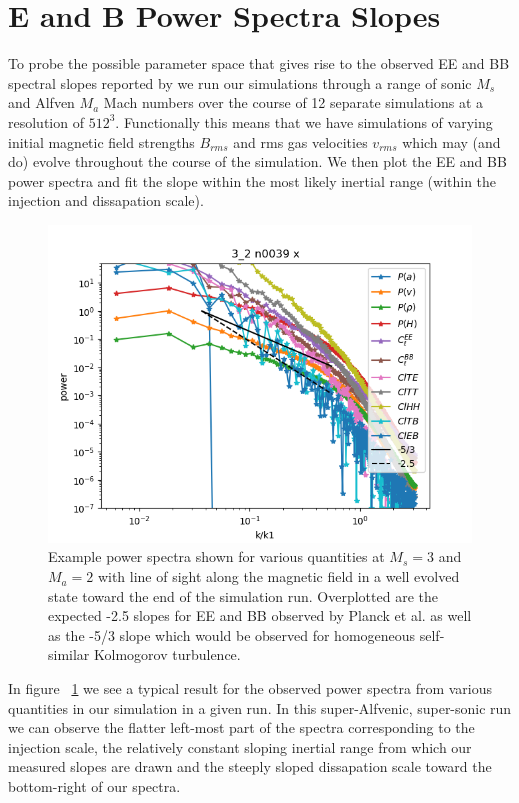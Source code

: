 \section{E and B Power Spectra Slopes}

To probe the possible parameter space that gives rise to the observed EE and BB spectral
slopes reported by \citep{Planck18XI} we run our simulations through a range of
sonic $M_s$ and Alfven $M_a$ Mach numbers over the course of 12 separate
simulations at a resolution of $512^3$. Functionally this means that we have
simulations of varying initial magnetic field strengths $B_{rms}$ and rms gas
velocities $v_{rms}$ which may (and do) evolve throughout the course of the
simulation. We then plot the EE and BB power spectra and fit the slope within
the most likely inertial range (within the injection and dissapation scale).

\begin{figure}[h]
\includegraphics[width=\linewidth]{3_2_spectra_0039_x.png}
\caption{Example power spectra shown for various quantities at $M_s=3$ and
$M_a=2$ with line of sight along the magnetic field in a well evolved state
toward the end of the simulation run. Overplotted are the expected -2.5 slopes
for EE and BB observed by Planck et al. as well as the -5/3 slope which would be
observed for homogeneous self-similar Kolmogorov turbulence.}
\label{fig:example_spectra}
\end{figure}

In figure ~\ref{fig:example_spectra} we see a typical result for the observed
power spectra from various quantities in our simulation in a given run. In this
super-Alfvenic, super-sonic run we can observe the flatter left-most part of the
spectra corresponding to the injection scale, the relatively constant sloping
inertial range from which our measured slopes are drawn and the steeply sloped
dissapation scale toward the bottom-right of our spectra. 

